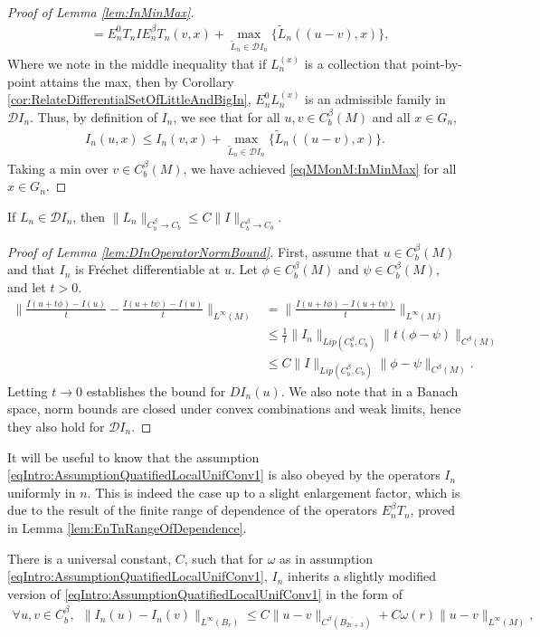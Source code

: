 \documentclass[11pt,reqno]{amsart}
\numberwithin{equation}{section}
\theoremstyle{plain}
\def\D{\mathcal D}
\def\om{\omega}
\newcommand{\norm}[1]{\lVert#1\rVert}
\begin{document}
\begin{proof}[Proof of Lemma \ref{lem:InMinMax}]
\begin{align*}
		&=E_n^0T_nIE_n^\beta T_n(v,x) + \max_{ \tilde L_n\in \D I_n}\{ \tilde L_n((u-v),x) \},
	\end{align*}
	Where we note in the middle inequality that if $L_n^{(x)}$ is a collection that point-by-point attains the max, then by Corollary \ref{cor:RelateDifferentialSetOfLittleAndBigIn}, $E_n^0L_n^{(x)}$ is an admissible family in $\D I_n$.
	Thus, by definition of $I_n$, we see that for all $u,v\in C^\beta_b(M)$ and all $x\in G_n$,
	\begin{align*}
		I_n(u,x)\leq I_n(v,x) + \max_{ \tilde L_n\in \D I_n}\{ \tilde L_n((u-v),x) \}.
	\end{align*}
	Taking a min over $v\in C^\beta_b(M)$, we have achieved \eqref{eqMMonM:InMinMax} for all $x\in G_n$.
\end{proof}


\begin{lem}\label{lem:DInOperatorNormBound}
	If $L_n\in \D I_n$, then 
	$\displaystyle \norm{L_n}_{C^\beta_b\to C_b}\leq C\norm{I}_{C^\beta_b\to C_b}$.
\end{lem}

\begin{proof}[Proof of Lemma \ref{lem:DInOperatorNormBound}]
	First, assume that $u\in C^\beta_b(M)$ and that $I_n$ is Fr\'echet differentiable at $u$.  Let $\phi\in C^\beta_b(M)$ and $\psi\in C^\beta_b(M)$, and let $t>0$.
	\begin{align*}
		\norm{\frac{I(u+t\phi)-I(u)}{t}-\frac{I(u+t\psi)-I(u)}{t}}_{L^\infty(M)} &= \norm{ \frac{I(u+t\phi)-I(u+t\psi)}{t} }_{L^\infty(M)}\\
		&\leq \frac{1}{t}\norm{I_n}_{Lip(C^\beta_b,C_b)}\norm{t(\phi-\psi)}_{C^\beta(M)}\\
		&\leq C\norm{I}_{Lip(C^\beta_b,C_b)}\norm{\phi-\psi}_{C^\beta(M)}.
	\end{align*}
	Letting $t\to 0$ establishes the bound for $DI_n(u)$.
	We also note that in a Banach space, norm bounds are closed under convex combinations and weak limits, hence they also hold for $\D I_n$.
\end{proof}

It will be useful to know that the assumption \eqref{eqIntro:AssumptionQuatifiedLocalUnifConv1} is also obeyed by the operators $I_n$ uniformly in $n$.  This is indeed the case up to a slight enlargement factor, which is due to the result of the finite range of dependence of the operators $E_n^\beta T_n$, proved in Lemma \ref{lem:EnTnRangeOfDependence}.

\begin{lem}\label{lem:InSatisfiesExtraAssumptions}
  There is a universal constant, $C$, such that for $\om$ as in assumption \eqref{eqIntro:AssumptionQuatifiedLocalUnifConv1}, $I_n$ inherits a slightly modified version of \eqref{eqIntro:AssumptionQuatifiedLocalUnifConv1} in the form of
    \begin{align}\label{eqMMonM:AssumptionQuatifiedLocalUnifConv1MODIFIED}
  	  \forall u,v\in C^\beta_b,\ \ \norm{I_n(u)-I_n(v)}_{L^\infty(B_r)}
  	  \leq C\norm{u-v}_{C^\beta(\overline{B_{2r+3}})} + C\om(r)\norm{u-v}_{L^\infty(M)},
    \end{align}
\end{lem}
\end{document}
